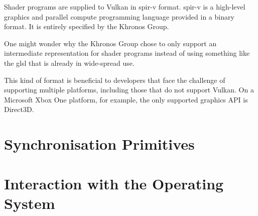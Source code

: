     Shader programs are supplied to Vulkan in \acrfull{spir-v} format. \acrshort{spir-v} is a high-level graphics and parallel compute programming language provided in a binary format. It is entirely specified by the Khronos Group.


    One might wonder why the Khronos Group chose to only support an intermediate representation for shader programs instead of using something like the \acrfull{glsl} that is already in wide-spread use. 

    This kind of format is beneficial to developers that face the challenge of supporting multiple platforms, including those that do not support Vulkan. On a Microsoft Xbox One platform, for example, the only supported graphics API is Direct3D.\todo{}

  \section{Synchronisation Primitives}

    \lipsum

  \section{Interaction with the Operating System}

    \lipsum
